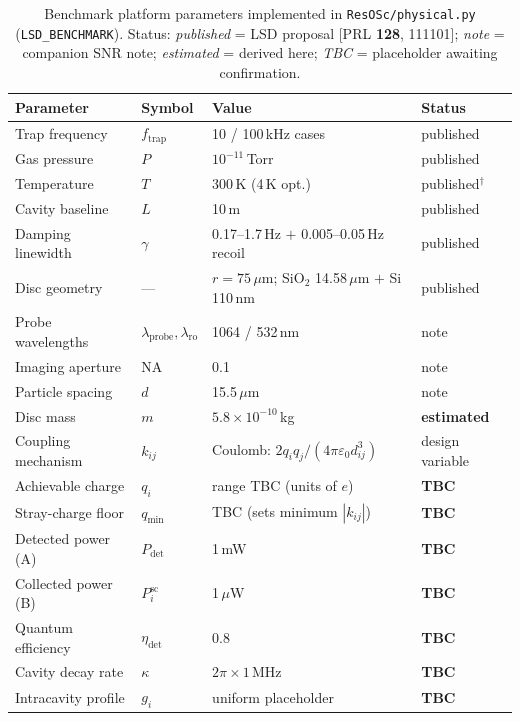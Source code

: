 \documentclass[11pt, letterpaper]{article}
\begin{document}
\begin{table}[h]
\centering
\caption{Benchmark platform parameters implemented in
\texttt{ResOSc/physical.py} (\texttt{LSD\_BENCHMARK}).  Status:
\emph{published} = LSD proposal [PRL \textbf{128}, 111101];
\emph{note} = companion SNR note; \emph{estimated} = derived here;
\emph{TBC} = placeholder awaiting confirmation.}
\label{tab:benchmark}
\begin{tabular}{@{}llll@{}}
\toprule
Parameter & Symbol & Value & Status \\
\midrule
Trap frequency        & $f_{\mathrm{trap}}$ & 10 / 100\,kHz cases & published \\
Gas pressure          & $P$        & $10^{-11}$\,Torr     & published \\
Temperature           & $T$        & 300\,K (4\,K opt.)  & published$^{\dag}$ \\
Cavity baseline       & $L$        & 10\,m                & published \\
Damping linewidth     & $\gamma$   & 0.17--1.7\,Hz $+$ 0.005--0.05\,Hz recoil & published \\
Disc geometry         & ---        & $r = 75\,\mu$m; SiO$_2$ 14.58\,$\mu$m $+$ Si 110\,nm & published \\
Probe wavelengths     & $\lambda_{\mathrm{probe}}, \lambda_{\mathrm{ro}}$ & 1064 / 532\,nm & note \\
Imaging aperture      & NA         & 0.1                  & note \\
Particle spacing      & $d$        & 15.5\,$\mu$m         & note \\
Disc mass             & $m$        & $5.8\times10^{-10}$\,kg & \textbf{estimated} \\
Coupling mechanism    & $k_{ij}$   & Coulomb: $2q_iq_j/(4\pi\varepsilon_0 d_{ij}^3)$ & design variable \\
Achievable charge     & $q_i$      & range TBC (units of $e$) & \textbf{TBC} \\
Stray-charge floor    & $q_{\min}$ & TBC (sets minimum $|k_{ij}|$) & \textbf{TBC} \\
Detected power (A)    & $P_{\mathrm{det}}$ & 1\,mW        & \textbf{TBC} \\
Collected power (B)   & $P_i^{\mathrm{sc}}$ & 1\,$\mu$W   & \textbf{TBC} \\
Quantum efficiency    & $\eta_{\mathrm{det}}$ & 0.8       & \textbf{TBC} \\
Cavity decay rate     & $\kappa$   & $2\pi \times 1$\,MHz & \textbf{TBC} \\
Intracavity profile   & $g_i$      & uniform placeholder  & \textbf{TBC} \\
\bottomrule
\end{tabular}
\end{table}
\end{document}
